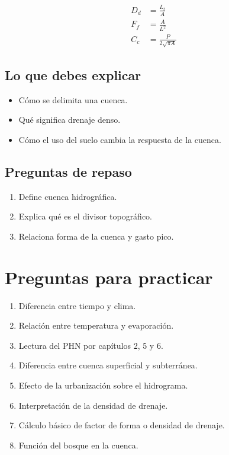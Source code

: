 \documentclass[11pt]{article}
\begin{document}
\begin{align*}
D_d &= \frac{L_t}{A} \\
F_f &= \frac{A}{L^2} \\
C_c &= \frac{P}{2\sqrt{\pi A}}
\end{align*}

\subsection{Lo que debes explicar}
\begin{itemize}
\item Cómo se delimita una cuenca.
\item Qué significa drenaje denso.
\item Cómo el uso del suelo cambia la respuesta de la cuenca.
\end{itemize}

\subsection{Preguntas de repaso}
\begin{enumerate}
\item Define cuenca hidrográfica.
\item Explica qué es el divisor topográfico.
\item Relaciona forma de la cuenca y gasto pico.
\end{enumerate}

\section{Preguntas para practicar}
\begin{enumerate}
\item Diferencia entre tiempo y clima.
\item Relación entre temperatura y evaporación.
\item Lectura del PHN por capítulos 2, 5 y 6.
\item Diferencia entre cuenca superficial y subterránea.
\item Efecto de la urbanización sobre el hidrograma.
\item Interpretación de la densidad de drenaje.
\item Cálculo básico de factor de forma o densidad de drenaje.
\item Función del bosque en la cuenca.
\end{enumerate}
\end{document}
